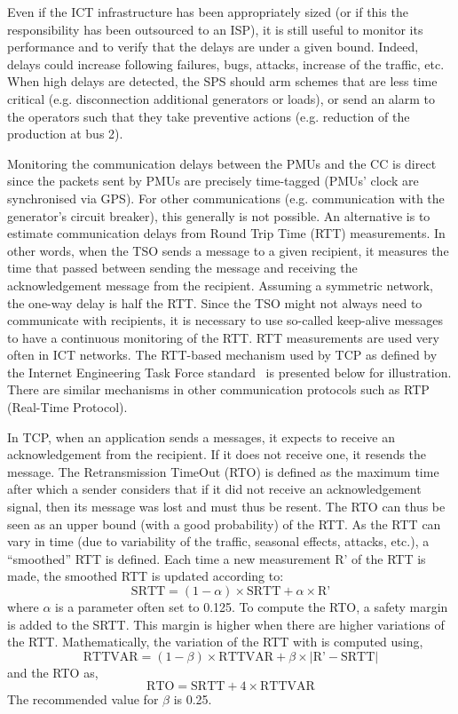 Even if the ICT infrastructure has been appropriately sized (or if this the responsibility has been outsourced to an ISP), it is still useful to monitor its performance and to verify that the delays are under a given bound. Indeed, delays could increase following failures, bugs, attacks, increase of the traffic, etc. When high delays are detected, the SPS should arm schemes that are less time critical (e.g. disconnection additional generators or loads), or send an alarm to the operators such that they take preventive actions (e.g. reduction of the production at bus 2).

Monitoring the communication delays between the PMUs and the CC is direct since the packets sent by PMUs are precisely time-tagged (PMUs' clock are synchronised via GPS). For other communications (e.g. communication with the generator's circuit breaker), this generally is not possible. An alternative is to estimate communication delays from Round Trip Time (RTT) measurements. In other words, when the TSO sends a message to a given recipient, it measures the time that passed between sending the message and receiving the acknowledgement message from the recipient. Assuming a symmetric network, the one-way delay is half the RTT. Since the TSO might not always need to communicate with recipients, it is necessary to use so-called keep-alive messages to have a continuous monitoring of the RTT. RTT measurements are used very often in ICT networks. The RTT-based mechanism used by TCP as defined by the Internet Engineering Task Force standard~\cite{roundTripTime} is presented below for illustration. There are similar mechanisms in other communication protocols such as RTP (Real-Time Protocol).

In TCP, when an application sends a messages, it expects to receive an acknowledgement from the recipient. If it does not receive one, it resends the message. The Retransmission TimeOut (RTO) is defined as the maximum time after which a sender considers that if it did not receive an acknowledgement signal, then its message was lost and must thus be resent. The RTO can thus be seen as an upper bound (with a good probability) of the RTT. As the RTT can vary in time (due to variability of the traffic, seasonal effects, attacks, etc.), a ``smoothed'' RTT is defined. Each time a new measurement R' of the RTT is made, the smoothed RTT is updated according to:
%
\begin{equation}\text{SRTT} = (1-\alpha)\times\text{SRTT} + \alpha\times\text{R'}\end{equation}
%
where \(\alpha\) is a parameter often set to 0.125. To compute the RTO, a safety margin is added to the SRTT. This margin is higher when there are higher variations of the RTT. Mathematically, the variation of the RTT with is computed using,
%
\begin{equation}\text{RTTVAR} = (1-\beta)\times\text{RTTVAR} + \beta\times |\text{R'}-\text{SRTT}|\end{equation}
%
and the RTO as,
%
\begin{equation}\text{RTO} = \text{SRTT} + 4 \times \text{RTTVAR}\end{equation}
%
The recommended value for \(\beta\) is 0.25.


